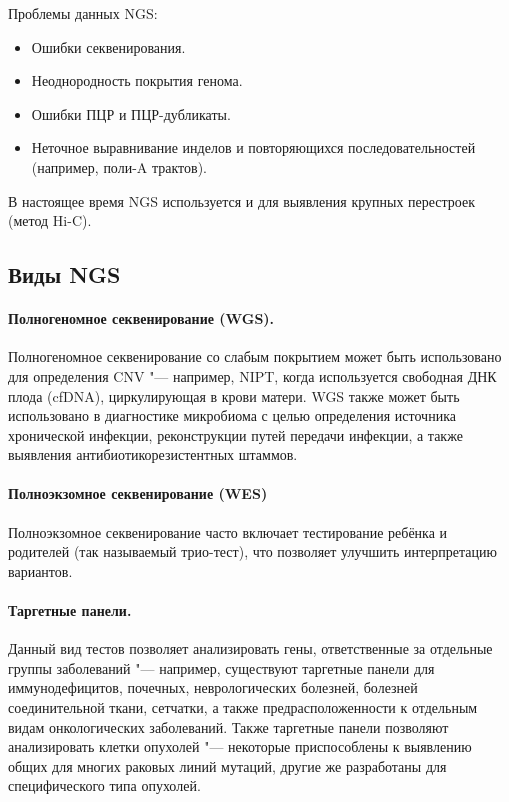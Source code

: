 \documentclass[a4paper,12pt]{article}
\begin{document}
Проблемы данных NGS:

\begin{itemize}
\item Ошибки секвенирования.
\item Неоднородность покрытия генома.
\item Ошибки ПЦР и ПЦР-дубликаты.
\item Неточное выравнивание инделов и повторяющихся последовательностей (например, поли-A трактов).
\end{itemize}

В настоящее время NGS используется и для выявления крупных перестроек (метод Hi-C).

\subsection{Виды NGS}

\paragraph{Полногеномное секвенирование (WGS).}

Полногеномное секвенирование со слабым покрытием может быть использовано для определения CNV "--- например, NIPT, когда используется свободная ДНК плода (cfDNA), циркулирующая в крови матери\cite{yu}.
WGS также может быть использовано в диагностике микробиома с целью определения источника хронической инфекции, реконструкции путей передачи инфекции, а также выявления антибиотикорезистентных штаммов\cite{balloux}.

\paragraph{Полноэкзомное секвенирование (WES)}
Полноэкзомное секвенирование часто включает тестирование ребёнка и родителей (так называемый трио-тест), что позволяет улучшить интерпретацию вариантов\cite{yohe}.

\paragraph{Таргетные панели.}
Данный вид тестов позволяет анализировать гены, ответственные за отдельные группы заболеваний "--- например, существуют таргетные панели для иммунодефицитов, почечных, неврологических болезней, болезней соединительной ткани, сетчатки, а также предрасположенности к отдельным видам онкологических заболеваний.
Также таргетные панели позволяют анализировать клетки опухолей "--- некоторые приспособлены к выявлению общих для многих раковых линий мутаций, другие же разработаны для специфического типа опухолей\cite{yohe}.
\end{document}
